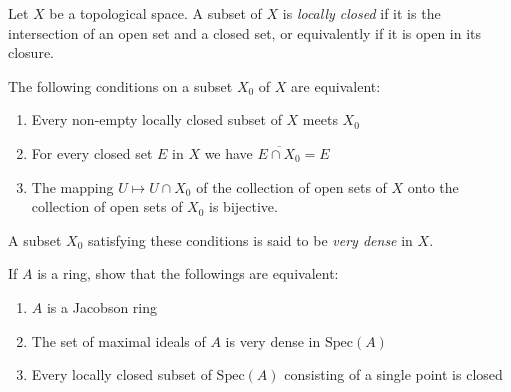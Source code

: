 \documentclass{solution}
\begin{document}
\begin{problem}
    Let $X$ be a topological space. A subset of $X$ is \textit{locally closed} if it is the intersection of an open set and a closed set, or equivalently if it is open in its closure.

    The following conditions on a subset $X_0$ of $X$ are equivalent:
    \begin{enumerate}
        \item Every non-empty locally closed subset of $X$ meets $X_0$
        \item For every closed set $E$ in $X$ we have $\overline{E \cap X_0} = E$
        \item The mapping $U \mapsto U \cap X_0$ of the collection of open sets of $X$ onto the collection of open sets of $X_0$ is bijective.
    \end{enumerate}

    A subset $X_0$ satisfying these conditions is said to be \textit{very dense} in $X$.

    If $A$ is a ring, show that the followings are equivalent:
    \begin{enumerate}
        \item $A$ is a Jacobson ring
        \item The set of maximal ideals of $A$ is very dense in $\mathrm{Spec}(A)$
        \item Every locally closed subset of $\mathrm{Spec}(A)$ consisting of a single point is closed
    \end{enumerate}
\end{problem}
\end{document}
